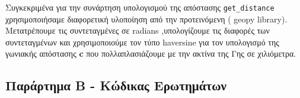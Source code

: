\documentclass{article}
\begin{document}
Συγκεκριμένα για την συνάρτηση υπολογισμού της απόστασης  \texttt{get\_distance}  χρησιμοποιήσαμε διαφορετική υλοποίηση από την προτεινόμενη ( geopy library). Μετατρέπουμε τις συντεταγμένες σε  radians ,υπολογίζουμε τις διαφορές των συντεταγμένων και χρησιμοποιούμε τον τύπο  haversine  για τον υπολογισμό της γωνιακής απόστασης \textbf{c} που πολλαπλασιάζουμε με την ακτίνα της Γης σε χιλιόμετρα.


\subsection{Παράρτημα B - Κώδικας Ερωτημάτων}
\label{subsec:apend_B}
\end{document}
